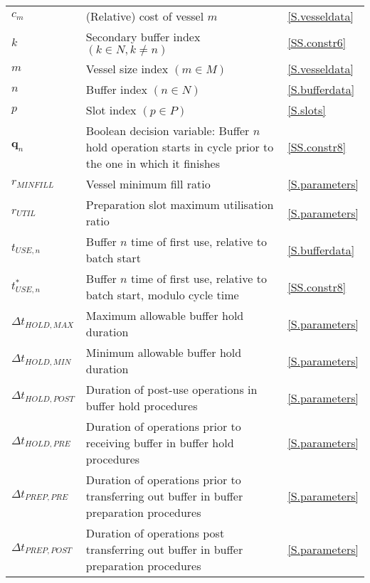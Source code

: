 {\begin{longtabu} to 
     &  & \\\hline
    \endhead
    $c_{m}$ & (Relative) cost of vessel $m$ & \ref{S.vesseldata}\\
    $k$ & Secondary buffer index $\left( k \in N, k \ne n \right)$
        & \ref{SS.constr6}\\
    $m$ & Vessel size index $\left( m \in M \right)$ & \ref{S.vesseldata}\\
    $n$ & Buffer index $\left( n \in N \right)$ & \ref{S.bufferdata}\\
    $p$ & Slot index $\left( p \in P \right)$ & \ref{S.slots}\\
    $\boldsymbol{q}_{n}$ & Boolean decision variable: Buffer $n$ hold operation
        starts in cycle prior to the one in which it finishes 
        & \ref{SS.constr8}\\
    $r_{\mathit{MINFILL}}$ & Vessel minimum fill ratio & \ref{S.parameters}\\
    $r_{\mathit{UTIL}}$ & Preparation slot maximum utilisation ratio
        & \ref{S.parameters}\\
    $t_{\mathit{USE},n}$ & Buffer $n$ time of first use, relative to batch
        start & \ref{S.bufferdata}\\
    $t_{\mathit{USE},n}^{*}$ & Buffer $n$ time of first use, relative to batch
        start, modulo cycle time & \ref{SS.constr8}\\
    $\Delta t_{\mathit{HOLD,MAX}}$ & Maximum allowable buffer hold duration
        & \ref{S.parameters}\\
    $\Delta t_{\mathit{HOLD,MIN}}$ & Minimum allowable buffer hold duration
        & \ref{S.parameters}\\
    $\Delta t_{\mathit{HOLD,POST}}$ & Duration of post-use operations in buffer
        hold procedures & \ref{S.parameters}\\
    $\Delta t_{\mathit{HOLD,PRE}}$ & Duration of operations prior to receiving
        buffer in buffer hold procedures & \ref{S.parameters}\\
    $\Delta t_{\mathit{PREP,PRE}}$ & Duration of operations prior to
        transferring out buffer in buffer preparation procedures & 
        \ref{S.parameters}\\
    $\Delta t_{\mathit{PREP,POST}}$ & Duration of operations post transferring
        out buffer in buffer preparation procedures & \ref{S.parameters}\\

\end{longtabu}}
